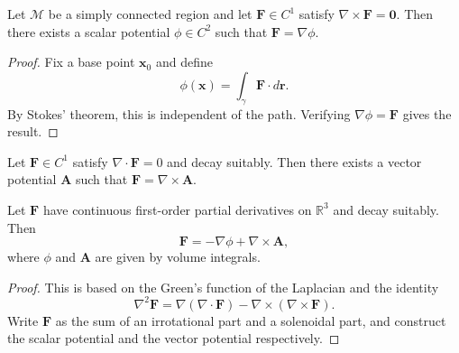 \begin{theorem}\label{thm:irrotational_potential}
Let $\mathcal{M}$ be a simply connected region and let $\mathbf{F} \in C^1$ satisfy $\nabla \times \mathbf{F} = \mathbf{0}$. Then there exists a scalar potential $\phi \in C^2$ such that $\mathbf{F} = \nabla \phi$.
\end{theorem}

\begin{proof}
Fix a base point $\mathbf{x}_0$ and define
\[
\phi(\mathbf{x}) = \int_{\gamma} \mathbf{F} \cdot d\mathbf{r}.
\]
By Stokes' theorem, this is independent of the path. Verifying $\nabla \phi = \mathbf{F}$ gives the result.
\end{proof}

\begin{theorem}\label{thm:solenoidal_potential}
Let $\mathbf{F} \in C^1$ satisfy $\nabla \cdot \mathbf{F} = 0$ and decay suitably. Then there exists a vector potential $\mathbf{A}$ such that $\mathbf{F} = \nabla \times \mathbf{A}$.
\end{theorem}

\begin{theorem}\label{thm:helmholtz}
Let $\mathbf{F}$ have continuous first-order partial derivatives on $\mathbb{R}^3$ and decay suitably. Then
\[
\mathbf{F} = -\nabla\phi + \nabla\times\mathbf{A},
\]
where $\phi$ and $\mathbf{A}$ are given by volume integrals.
\end{theorem}

\begin{proof}
This is based on the Green's function of the Laplacian and the identity
\[
\nabla^2 \mathbf{F} = \nabla(\nabla \cdot \mathbf{F}) - \nabla \times (\nabla \times \mathbf{F}).
\]
Write $\mathbf{F}$ as the sum of an irrotational part and a solenoidal part, and construct the scalar potential and the vector potential respectively.
\end{proof}

